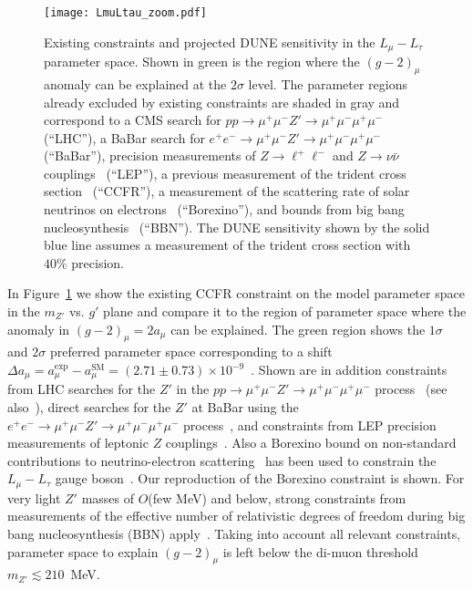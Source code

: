 \begin{figure}[tb!] \centering
\texttt{[image: LmuLtau\_zoom.pdf]}
\caption[Existing constraints and projected sensitivity in the $L_\mu - L_\tau$ parameter space]{Existing constraints and projected DUNE sensitivity in the $L_\mu - L_\tau$ parameter space. Shown in green is the region where the $(g-2)_\mu$ anomaly can be explained at the $2\sigma$ level. The parameter regions already excluded by existing constraints are shaded in gray and correspond to a CMS search for $pp \to \mu^+\mu^- Z' \to \mu^+\mu^-\mu^+\mu^-$~\cite{Sirunyan:2018nnz} (``LHC''), a BaBar search for $e^+e^- \to \mu^+\mu^- Z' \to \mu^+\mu^-\mu^+\mu^-$~\cite{TheBABAR:2016rlg} (``BaBar''), precision measurements of $Z \to \ell^+ \ell^-$ and $Z \to \nu\bar\nu$ couplings~\cite{ALEPH:2005ab,Altmannshofer:2014cfa} (``LEP''), a previous measurement of the trident cross section~\cite{Mishra:1991bv,Altmannshofer:2014pba} (``CCFR''), a measurement of the scattering rate of solar neutrinos on electrons~\cite{Bellini:2011rx,Harnik:2012ni,Agostini:2017ixy} (``Borexino''), and bounds from big bang nucleosynthesis~\cite{Ahlgren:2013wba,Kamada:2015era} (``BBN''). The DUNE sensitivity shown by the solid blue line assumes a measurement of the trident cross section with $40\%$ precision.}
\label{fig:LmuLtau}
\end{figure}

In Figure~\ref{fig:LmuLtau} we show the existing CCFR constraint on the model parameter space in the $m_{Z'}$ vs. $g'$ plane and compare it to the region of parameter space where the anomaly in $(g-2)_\mu = 2 a_\mu$ can be explained. The green region shows the $1\sigma$ and $2\sigma$ preferred parameter space corresponding to a shift $\Delta a_\mu = a_\mu^\text{exp}-a_\mu^\text{SM} = (2.71 \pm 0.73) \times 10^{-9}$~\cite{Keshavarzi:2018mgv}.
Shown are in addition constraints from LHC searches for the $Z'$ in the $pp \to \mu^+\mu^- Z' \to \mu^+\mu^-\mu^+\mu^-$ process~\cite{Sirunyan:2018nnz} (see also~\cite{Altmannshofer:2014pba}), direct searches for the $Z'$ at BaBar using the $e^+e^- \to \mu^+\mu^- Z' \to \mu^+\mu^-\mu^+\mu^-$ process~\cite{TheBABAR:2016rlg}, and constraints from LEP precision measurements of leptonic $Z$ couplings~\cite{ALEPH:2005ab,Altmannshofer:2014cfa}.  
Also a Borexino bound on non-standard contributions to neutrino-electron scattering~\cite{Harnik:2012ni,Bellini:2011rx,Agostini:2017ixy} has been used to constrain the $L_\mu - L_\tau$ gauge boson~\cite{Kamada:2015era,Araki:2015mya,Kamada:2018zxi}. Our reproduction of the Borexino constraint is shown. 
For very light $Z'$ masses of $O$(few MeV) and below, strong constraints from measurements of the effective number of relativistic degrees of freedom during big bang nucleosynthesis (BBN) apply~\cite{Ahlgren:2013wba,Kamada:2015era}.
Taking into account all relevant constraints, parameter space to explain $(g-2)_\mu$ is left below the di-muon threshold $m_{Z'} \lesssim 210$~MeV.


